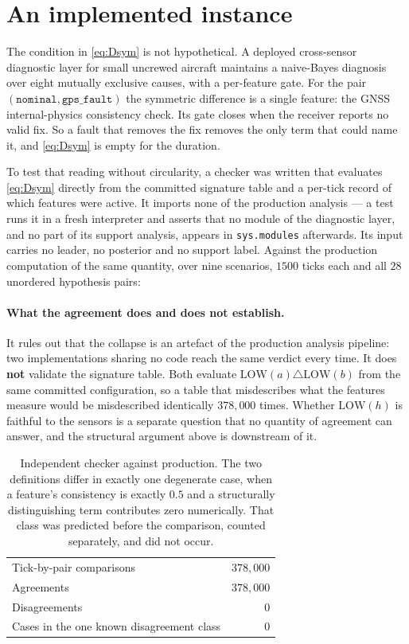 \documentclass[11pt,a4paper]{article}
\newcommand{\code}[1]{\texttt{\small #1}}
\theoremstyle{definition}
\begin{document}
\section{An implemented instance}
\label{sec:instance}

The condition in \eqref{eq:Dsym} is not hypothetical. A deployed cross-sensor
diagnostic layer for small uncrewed aircraft maintains a naive-Bayes diagnosis
over eight mutually exclusive causes, with a per-feature gate. For the pair
$(\texttt{nominal},\texttt{gps\_fault})$ the symmetric difference is a single
feature: the GNSS internal-physics consistency check. Its gate closes when the
receiver reports no valid fix. So a fault that removes the fix removes the only
term that could name it, and \eqref{eq:Dsym} is empty for the duration.

To test that reading without circularity, a checker was written that evaluates
\eqref{eq:Dsym} directly from the committed signature table and a per-tick
record of which features were active. It imports none of the production
analysis --- a test runs it in a fresh interpreter and asserts that no module
of the diagnostic layer, and no part of its support analysis, appears in
\code{sys.modules} afterwards. Its input carries no leader, no posterior and no
support label. Against the production computation of the same quantity, over
nine scenarios, $1500$ ticks each and all $28$ unordered hypothesis pairs:

\paragraph{What the agreement does and does not establish.} It rules out that
the collapse is an artefact of the production analysis pipeline: two
implementations sharing no code reach the same verdict every time. It does
\textbf{not} validate the signature table. Both evaluate
$\mathrm{LOW}(a)\triangle\mathrm{LOW}(b)$ from the same committed
configuration, so a table that misdescribes what the features measure would be
misdescribed identically $378{,}000$ times. Whether $\mathrm{LOW}(h)$ is
faithful to the sensors is a separate question that no quantity of agreement
can answer, and the structural argument above is downstream of it.

\begin{table}[h]
\centering
\small
\begin{tabular}{lr}
\toprule
Tick-by-pair comparisons & $378{,}000$ \\
Agreements & $378{,}000$ \\
Disagreements & $0$ \\
Cases in the one known disagreement class & $0$ \\
\bottomrule
\end{tabular}
\caption{Independent checker against production. The two definitions differ in
exactly one degenerate case, when a feature's consistency is exactly $0.5$ and
a structurally distinguishing term contributes zero numerically. That class was
predicted before the comparison, counted separately, and did not occur.}
\label{tab:checker}
\end{table}
\end{document}

